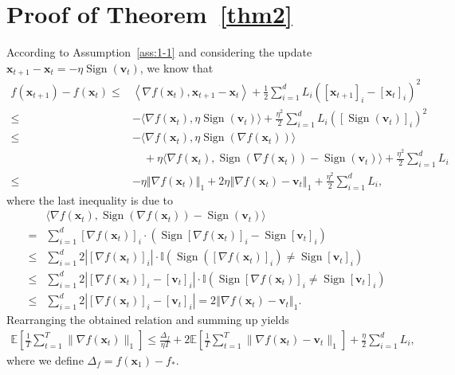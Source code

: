 \documentclass{article}
\newcommand{\E}{\mathbb{E}}
\DeclareMathOperator{\sign}{sign}
\def \E {\mathbb{E}}
\def \v {\mathbf{v}}
\def \x {\mathbf{x}}
\def \sign  {\operatorname{Sign}}
\newcommand{\inner}[2]{\langle #1, #2 \rangle}
\newcommand{\norm}[1]{\left\Vert#1\right\Vert}
\newcommand{\abs}[1]{\left|#1\right|}
\newcommand{\sqbrac}[1]{\left[#1\right]}
\newcommand{\brac}[1]{\left(#1\right)}
\def \E {\mathbb{E}}
\def \x {\mathbf{x}}
\def \v {\mathbf{v}}
\def \ind {\mathbb{I}}
\begin{document}


\newpage
\appendix

\section{Proof of Theorem~\ref{thm2}}

According to Assumption~\ref{ass:1-1} and considering the update $\x_{t+1}-\x_t=-\eta\sign{(\v_t)}$, we know that
    \begin{align*}
        f(\x_{t+1})-f(\x_t)\le& \left\langle \nabla f(\x_t), \x_{t+1} - \x_t \right\rangle + \frac{1}{2}\sum_{i=1}^d L_i ([\x_{t+1}]_i - [\x_{t}]_i)^2  \\ 
        \le &-\inner{\nabla f(\x_t)}{\eta\sign{(\v_t)}} + \frac{\eta^2}{2}\sum_{i=1}^d L_i  ([\sign{(\v_t)}]_i)^2\\
        \le&-\inner{\nabla f(\x_t)}{\eta\sign{\left(\nabla f(\x_t)\right)}}\\&\quad+\eta\inner{\nabla f(\x_t)}{\sign{\left(\nabla f(\x_t)\right)}-\sign{(\v_t)}}+ \frac{\eta^2}{2}\sum_{i=1}^d L_i\\
        \le&-\eta\norm{\nabla f(\x_t)}_1+2\eta\norm{\nabla f(\x_t)-\v_t}_1+ \frac{\eta^2}{2}\sum_{i=1}^d L_i,
\end{align*}
    where the last inequality is due to
    \begin{align*}
        &\inner{\nabla f(\x_t)}{\sign{\left(\nabla f(\x_t)\right)}-\sign{(\v_t)}}\\
        =&\sum_{i=1}^d\sqbrac{\nabla f(\x_t)}_i\cdot\brac{\sign{\sqbrac{\nabla f(\x_t)}_i}-\sign{\sqbrac{\v_t}_i}}\\\le&\sum_{i=1}^d2\abs{\sqbrac{\nabla f(\x_t)}_i}\cdot\ind\brac{\sign{\left(\sqbrac{\nabla f(\x_t)}_i\right)}\ne\sign{\sqbrac{\v_t}_i}}\\\le&\sum_{i=1}^d2\abs{\sqbrac{\nabla f(\x_t)}_i-\sqbrac{\v_t}_i}\cdot\ind\brac{\sign{\sqbrac{\nabla f(\x_t)}_i}\ne\sign{\sqbrac{\v_t}_i}}\\\le&\sum_{i=1}^d2\abs{\sqbrac{\nabla f(\x_t)}_i-\sqbrac{\v_t}_i}=2\norm{\nabla f(\x_t)-\v_t}_1.
    \end{align*}
    Rearranging the obtained relation and summing up yields
    \begin{align}\label{eq:Linf-mid}
        \E\left[\frac{1}{T}\sum_{t=1}^{T} \|\nabla f(\x_t)\|_1\right] 
        \leq \frac{\Delta_f}{\eta T} +  2 \E\left[\frac{1}{T}\sum_{t=1}^{T} \|\nabla f(\x_t) - \v_t\|_1\right] +\frac{\eta}{2}\sum_{i=1}^d L_i,
    \end{align}
where we define  $\Delta_{f}=f\left(\x_{1}\right)-f_{*}$. 
\end{document}
